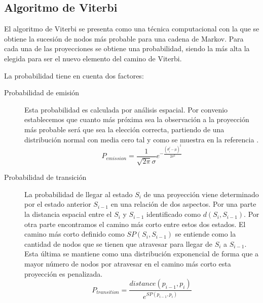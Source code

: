 \subsection{Algoritmo de Viterbi}
El algoritmo de Viterbi se presenta como una técnica computacional con la que se obtiene la sucesión de 
nodos más probable para una cadena de Markov. Para cada una de las proyecciones se obtiene una probabilidad, 
siendo la más alta la elegida para ser el nuevo elemento del camino de Viterbi.

La probabilidad tiene en cuenta dos factores:
\begin{description}
\item [Probabilidad de emisión] Esta probabilidad es calculada por análisis espacial. Por convenio establecemos 
que cuanto más próxima sea la observación a la proyección más probable será que sea la elección correcta, 
partiendo de una distribución normal con media cero tal y como se muestra en la referencia \cite{HMM01}.
\begin{equation}
P_{emission}=\frac{1}{\sqrt{2\pi}\sigma}e^{-\frac{(d_{i}^{j}-\mu)^{2}}{2\sigma^{2}}} 
\end{equation}

\item [Probabilidad de transición] La probabilidad de llegar al estado $S_{i}$ de una proyección viene 
determinado por el estado anterior $S_{i-1}$ en una relación de dos aspectos. Por una parte la distancia 
espacial entre el  $S_{i}$ y $S_{i-1}$ identificado como $d(S_{i},S_{i-1})$. Por otra parte encontramos el 
camino más corto entre estos dos estados. El camino más corto definido como $SP(S_{i},S_{i-1})$ se entiende 
como la cantidad de nodos que se tienen que atravesar para llegar de  $S_{i}$ a $S_{i-1}$. Esta última se mantiene 
como una distribución exponencial de forma que a mayor número de nodos por atravesar en el camino más 
corto esta proyección es penalizada.
\begin{equation} 
P_{transition}=\frac{distance(p_{i-1}, p_{i})}{e^{SP(p_{i-1}, p_{i})}}
\end{equation}
\end{description}


